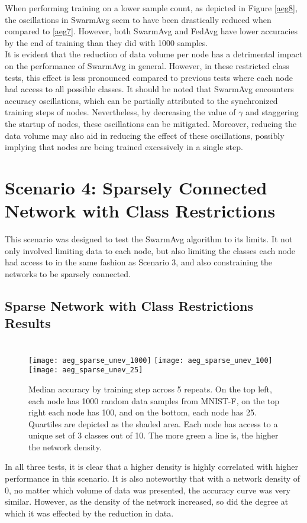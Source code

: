When performing training on a lower sample count, as depicted in Figure \ref{aeg8}, the oscillations in SwarmAvg seem to have been drastically reduced when compared to \ref{aeg7}. However, both SwarmAvg and FedAvg have lower accuracies by the end of training than they did with 1000 samples. \\

It is evident that the reduction of data volume per node has a detrimental impact on the performance of SwarmAvg in general. However, in these restricted class tests, this effect is less pronounced compared to previous tests where each node had access to all possible classes. It should be noted that SwarmAvg encounters accuracy oscillations, which can be partially attributed to the synchronized training steps of nodes. Nevertheless, by decreasing the value of $\gamma$ and staggering the startup of nodes, these oscillations can be mitigated. Moreover, reducing the data volume may also aid in reducing the effect of these oscillations, possibly implying that nodes are being trained excessively in a single step.

\section{Scenario 4: Sparsely Connected Network with Class Restrictions}
This scenario was designed to test the SwarmAvg algorithm to its limits. It not only involved limiting data to each node, but also limiting the classes each node had access to in the same fashion as Scenario 3, and also constraining the networks to be sparsely connected.

\subsection{Sparse Network with Class Restrictions Results}

\begin{figure}[H] 
	 \\
	\texttt{[image: aeg\_sparse\_unev\_1000]}
	\texttt{[image: aeg\_sparse\_unev\_100]}
	\texttt{[image: aeg\_sparse\_unev\_25]}
	\caption{Median accuracy by training step across 5 repeats. On the top left, each node has 1000 random data samples from MNIST-F, on the top right each node has 100, and on the bottom, each node has 25. Quartiles are depicted as the shaded area. Each node has access to a unique set of 3 classes out of 10. The more green a line is, the higher the network density.}
	\label{aeg9}
\end{figure}

In all three tests, it is clear that a higher density is highly correlated with higher performance in this scenario. It is also noteworthy that with a network density of 0, no matter which volume of data was presented, the accuracy curve was very similar. However, as the density of the network increased, so did the degree at which it was effected by the reduction in data.

